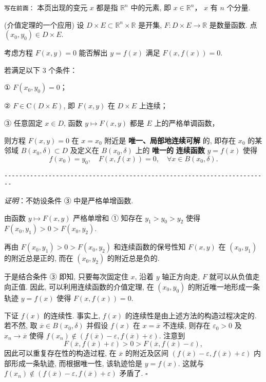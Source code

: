 
\verb|写在前面：|
本页出现的变元 $x$ 都是指 $\mathbb{R}^n$ 中的元素, 即 $x\in\mathbb{R}^n$， $x$ 有 $n$ 个分量.


\begin{theorem}{(介值定理的一个应用)}\label{impli_the1}
设 $D\times E\subset\mathbb{R}^{n}\times\mathbb{R}$ 是开集,
$F:D\times E\rightarrow\mathbb{R}$ 是数量函数. 点 $(x_{0},y_{0})\in D\times E.$ 

考虑方程 $F(x,y)=0$ 能否解出 $y=f(x)$ 满足 $F(x,f(x))=0.$ 

若满足以下 3 个条件：

① $F(x_{0},y_{0})=0$；

② $F\in\mathrm{C}(D\times E)$, 即 $F(x,y)$ 在 $D\times E$ 上连续；

③ 任意固定 $x\in D$, 函数 $y\mapsto F(x,y)$ 都是 $E$ 上的严格单调函数， 

则方程 $F(x,y)=0$ 在 $x=x_{0}$ 附近是\textbf{ 唯一、局部地连续可解} 的, 即存在 $x_{0}$
的某邻域 $B(x_{0},\delta)\subset D$ 及定义在 $B(x_{0},\delta)$ 上的 \textbf{唯一的}\textbf{
连续函数} $y=f(x)$ 使得
\[
f(x_{0})=y_{0},\quad F(x,f(x))=0,\quad\forall x\in B(x_{0},\delta).
\]

\verb|------------------------------------------------------------------------|

\textsl{证明}：不妨设条件 ③ 中是严格单增函数. 

由函数 $y\mapsto F(x,y)$ 严格单增和 ① 知存在 $y_{1}>y_{0}>y_{2}$ 使得 $F(x_{0},y_{1})>0>F(x_{0},y_{2})$. 

再由 $F(x_{0},y_{1})>0>F(x_{0},y_{2})$ 和连续函数的保号性知 $F(x,y)$ 在 $(x_{0},y_{1})$
的附近总是正的, 而在 $(x_{0},y_{2})$ 的附近总是负的. 

于是结合条件 ③ 即知, 只要每次固定住 $x$, 沿着 $y$ 轴正方向走, $F$ 就可以从负值走向正值. 因此, 可以利用连续函数的介值定理,
在 $(x_{0},y_{0})$ 的附近唯一地形成一条轨迹 $y=f(x)$ 使得 $F(x,f(x))=0$. 

下证 $f(x)$ 的连续性. 事实上, $f(x)$ 的连续性是由上述方法的构造过程决定的. 若不然, 取 $\overline{x}\in B(x_0,\delta)$ 并假设 $f(x)$ 在
$x=\overline{x}$ 不连续, 则存在 $\varepsilon_{0}>0$ 及 $x_{n}\rightarrow\overline{x}$
使得 $f(x_{n})\notin(f(\overline{x})-\varepsilon,f(\overline{x})+\varepsilon)$.
注意到
\[
F(\overline{x},f(\overline{x})+\varepsilon)>0>F(\overline{x},f(\overline{x})-\varepsilon),
\]
因此可以重复存在性的构造过程, 在 \textbf{$\overline{x}$ }的附近及区间 $(f(\overline{x})-\varepsilon,f(\overline{x})+\varepsilon)$
内部形成一条轨迹, 而根据唯一性, 该轨迹恰是 $y=f(x)$. 这就与 $f(x_{n})\notin(f(\overline{x})-\varepsilon,f(\overline{x})+\varepsilon)$
矛盾了. $\square$ 
\end{theorem}
\verb| |

